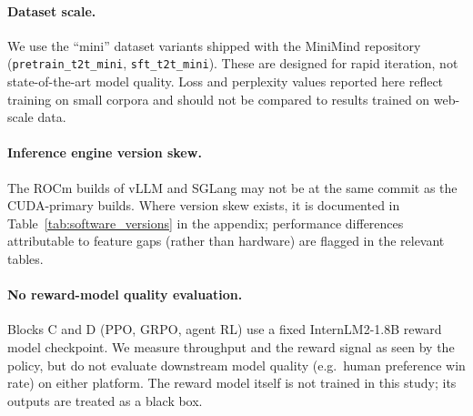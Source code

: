 \paragraph{Dataset scale.}
We use the ``mini'' dataset variants shipped with the MiniMind repository
(\texttt{pretrain\_t2t\_mini}, \texttt{sft\_t2t\_mini}).  These are
designed for rapid iteration, not state-of-the-art model quality.  Loss
and perplexity values reported here reflect training on small corpora and
should not be compared to results trained on web-scale data.

\paragraph{Inference engine version skew.}
The ROCm builds of vLLM and SGLang may not be at the same commit as the
CUDA-primary builds.  Where version skew exists, it is documented in
Table~\ref{tab:software_versions} in the appendix; performance differences
attributable to feature gaps (rather than hardware) are flagged in the
relevant tables.

\paragraph{No reward-model quality evaluation.}
Blocks C and D (PPO, GRPO, agent RL) use a fixed InternLM2-1.8B reward
model checkpoint.  We measure throughput and the reward signal as seen by
the policy, but do not evaluate downstream model quality (e.g.\ human
preference win rate) on either platform.  The reward model itself is not
trained in this study; its outputs are treated as a black box.
